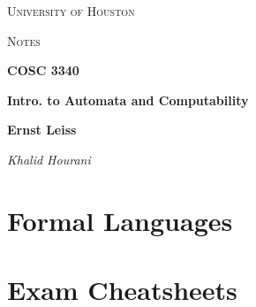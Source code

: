 \documentclass[a4paper]{article}
\theoremstyle{definition}
\begin{document}
\begin{titlepage}
	\centering
	{\scshape\LARGE University of Houston\par}
	\vspace{1cm}
	{\scshape\Large Notes \par}
	\vspace{1.5cm}
	{\huge\bfseries COSC 3340 \par}
	{\huge\bfseries Intro. to Automata and Computability \par}
	\vspace{0.5cm}
	{\large\bfseries Ernst Leiss\par}
	\vspace{1cm}
	{\Large\itshape Khalid Hourani}
	\vspace{0.5cm}
	{\large \par} %
	\vfill
\end{titlepage}

\tableofcontents
\newpage{}

\section{Formal Languages}\label{sec:introduction}






\section{Exam Cheatsheets}

\end{document}
